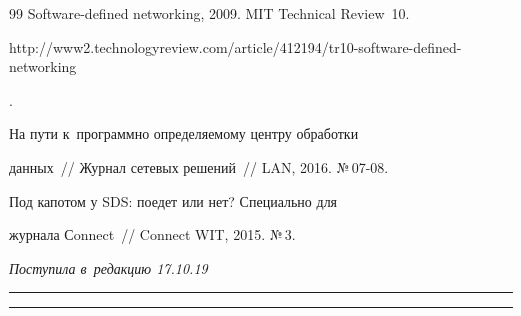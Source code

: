 {{\begin{thebibliography}{99}
Software-defined networking, 2009. MIT Technical Review~10. {\sf 


http://www2.technologyreview.com/article/412194/tr10-software-defined-networking}.




 На пути к~программно определяемому центру обработки 


данных~/\!\!/ Журнал сетевых решений~/\!\!/ LAN, 2016. №\,07-08.




 Под капотом у SDS: поедет или нет? Специально для 


журнала Сonnect~/\!\!/ Connect WIT, 2015. №\,3.








 \end{thebibliography}


} }








\vspace*{-3pt}





\hfill{\small\textit{Поступила в~редакцию 17.10.19}}








\vspace*{8pt}





\hrule





\vspace*{2pt}















\hrule





\vspace*{8pt}





